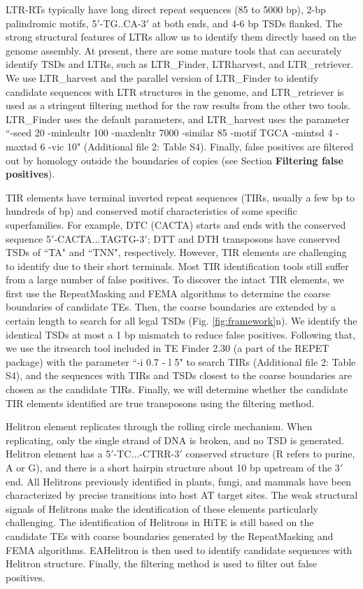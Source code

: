 \documentclass{bmcart}
\begin{document}
LTR-RTs typically have long direct repeat sequences (85 to 5000 bp), 2-bp palindromic motifs, 5$'$-TG..CA-3$'$ at both ends, and 4-6 bp TSDs flanked. The strong structural features of LTRs allow us to identify them directly based on the genome assembly. At present, there are some mature tools that can accurately identify TSDs and LTRs, such as LTR\_Finder, LTRharvest, and LTR\_retriever. We use LTR\_harvest and the parallel version of LTR\_Finder\cite{ou2019ltr_finder_parallel, xu2007ltr_finder} to identify candidate sequences with LTR structures in the genome, and LTR\_retriever is used as a stringent filtering method for the raw results from the other two tools. LTR\_Finder uses the default parameters, and LTR\_harvest uses the parameter ``-seed 20 -minlenltr 100 -maxlenltr 7000 -similar 85 -motif TGCA -mintsd 4 -maxtsd 6 -vic 10" (Additional file 2: Table S4).  Finally, false positives are filtered out by homology outside the boundaries of copies (see Section \textbf{Filtering false positives}).

TIR elements have terminal inverted repeat sequences (TIRs, usually a few bp to hundreds of bp) and conserved motif characteristics of some specific superfamilies. For example, DTC (CACTA) starts and ends with the conserved sequence 5$'$-CACTA...TAGTG-3$'$; DTT and DTH transposons have conserved TSDs of ``TA" and ``TNN", respectively. However, TIR elements are challenging to identify due to their short terminals. Most TIR identification tools still suffer from a large number of false positives. To discover the intact TIR elements, we first use the RepeatMasking and FEMA algorithms to determine the coarse boundaries of candidate TEs. Then, the coarse boundaries are extended by a certain length to search for all legal TSDs (Fig. \ref{fig:framework}n). We identify the identical TSDs at most a 1 bp mismatch to reduce false positives. Following that, we use the itrsearch tool included in TE Finder 2.30 (a part of the REPET\cite{quesneville2010repet} package) with the parameter ``-i 0.7 - l 5" to search TIRs (Additional file 2: Table S4), and the sequences with TIRs and TSDs closest to the coarse boundaries are chosen as the candidate TIRs. Finally, we will determine whether the candidate TIR elements identified are true transposons using the filtering method. 

Helitron element replicates through the rolling circle mechanism. When replicating, only the single strand of DNA is broken, and no TSD is generated. Helitron element has a 5$'$-TC...-CTRR-3$'$ conserved structure (R refers to purine, A or G), and there is a short hairpin structure about 10 bp upstream of the 3$'$ end. All Helitrons previously identified in plants, fungi, and mammals have been characterized by precise transitions into host AT target sites\cite{kapitonov2007helitrons}. The weak structural signals of Helitrons make the identification of these elements particularly challenging. The identification of Helitrons in HiTE is still based on the candidate TEs with coarse boundaries generated by the RepeatMasking and FEMA algorithms. EAHelitron\cite{hu2019helitron} is then used to identify candidate sequences with Helitron structure. Finally, the filtering method is used to filter out false positives.
\end{document}
